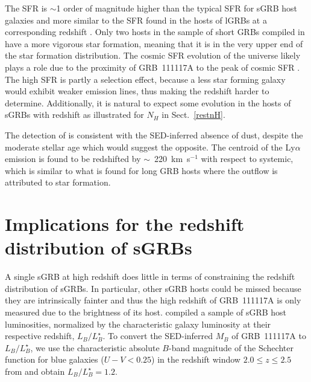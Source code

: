 \documentclass{aa}    %
\begin{document}
The SFR is $\sim$1 order of magnitude higher than the typical SFR for sGRB host
galaxies \citep{Berger2014} and more similar to the SFR found in the hosts of
lGRBs at a corresponding redshift \citep{Kruhler2015}. Only two hosts in the
sample of short GRBs compiled in \citet{Berger2014} have a more vigorous star
formation, meaning that it is in the very upper end of the star formation
distribution. The cosmic SFR evolution of the universe likely plays a role due
to the proximity of GRB~111117A to the peak of cosmic SFR \citep{Madau2014}.
The high SFR is partly a selection effect, because a less star forming galaxy
would exhibit weaker emission lines, thus making the redshift harder to
determine. Additionally, it is natural to expect some evolution in the hosts of
sGRBs with redshift as illustrated for $N_H$ in Sect.~\ref{restnH}.

The detection of \lya{} is consistent with the SED-inferred absence of dust,
despite the moderate stellar age which would suggest the opposite. The centroid
of the Ly$\alpha$ emission is found to be redshifted by $\sim$~220~km~s$^{-1}$
with respect to systemic, which is similar to what is found for long GRB hosts
\citep{Milvang-Jensen2012a} where the outflow is attributed to star formation. 




\section{Implications for the redshift distribution of sGRBs}


A single sGRB at high redshift does little in terms of constraining the redshift
distribution of sGRBs. In particular, other sGRB hosts could be missed because
they are intrinsically fainter and thus the high redshift of GRB~111117A is only
measured due to the brightness of its host. \citet{Berger2014} compiled a
sample of sGRB host luminosities, normalized by the characteristic galaxy
luminosity at their respective redshift, $L_B/L^{\star}_{B}$. To convert the
SED-inferred $M_B$ of GRB~111117A to $L_B/L^{\star}_{B}$, we use the
characteristic absolute $B$-band magnitude of the Schechter function for blue
galaxies ($U - V < 0.25$) in the redshift window $2.0 \leq z \leq 2.5$ from
\citet{Marchesini2007} and obtain $L_B/L^{\star}_{B} = 1.2$.
\end{document}
